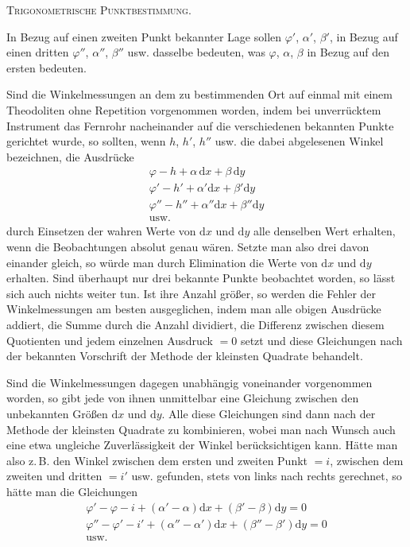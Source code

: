 \begingroup
\clearpage
{}\hfill\textsc{Trigonometrische Punktbestimmung.}\hfill\mbox{}\par\medskip
In Bezug auf einen zweiten Punkt bekannter Lage sollen $\varphi'$, $\alpha'$, $\beta'$, in Bezug auf einen dritten $\varphi''$, $\alpha''$, $\beta''$ usw. dasselbe bedeuten, was $\varphi$, $\alpha$, $\beta$ in Bezug auf den ersten bedeuten.

Sind die Winkelmessungen an dem zu bestimmenden Ort auf einmal mit einem Theodoliten ohne Repetition vorgenommen worden, indem bei unverrücktem Instrument das Fernrohr nacheinander auf die verschiedenen bekannten Punkte gerichtet wurde, so sollten, wenn $h$, $h'$, $h''$ usw. die dabei abgelesenen Winkel bezeichnen, die Ausdrücke
\[
\begin{gathered}
\varphi-h+\alpha\,\mathrm dx+\beta\,\mathrm dy\\
\varphi'-h'+\alpha'\mathrm dx+\beta'\mathrm dy\\
\varphi''-h''+\alpha''\mathrm dx+\beta''\mathrm dy\\
\text{usw.}
\end{gathered}
\]
durch Einsetzen der wahren Werte von $\mathrm dx$ und $\mathrm dy$ alle denselben Wert erhalten, wenn die Beobachtungen absolut genau wären. Setzte man also drei davon einander gleich, so würde man durch Elimination die Werte von $\mathrm dx$ und $\mathrm dy$ erhalten. Sind überhaupt nur drei bekannte Punkte beobachtet worden, so lässt sich auch nichts weiter tun. Ist ihre Anzahl größer, so werden die Fehler der Winkelmessungen am besten ausgeglichen, indem man alle obigen Ausdrücke addiert, die Summe durch die Anzahl dividiert, die Differenz zwischen diesem Quotienten und jedem einzelnen Ausdruck $=0$ setzt und diese Gleichungen nach der bekannten Vorschrift der Methode der kleinsten Quadrate behandelt.

Sind die Winkelmessungen dagegen unabhängig voneinander vorgenommen worden, so gibt jede von ihnen unmittelbar eine Gleichung zwischen den unbekannten Größen $\mathrm dx$ und $\mathrm dy$. Alle diese Gleichungen sind dann nach der Methode der kleinsten Quadrate zu kombinieren, wobei man nach Wunsch auch eine etwa ungleiche Zuverlässigkeit der Winkel berücksichtigen kann. Hätte man also z.\,B. den Winkel zwischen dem ersten und zweiten Punkt $=i$, zwischen dem zweiten und dritten $=i'$ usw. gefunden, stets von links nach rechts gerechnet, so hätte man die Gleichungen
\[
\begin{gathered}
\varphi'-\varphi-i+(\alpha'-\alpha)\mathrm dx+(\beta'-\beta)\mathrm dy=0\\
\varphi''-\varphi'-i'+(\alpha''-\alpha')\mathrm dx+(\beta''-\beta')\mathrm dy=0\\
\text{usw.}
\end{gathered}
\]

